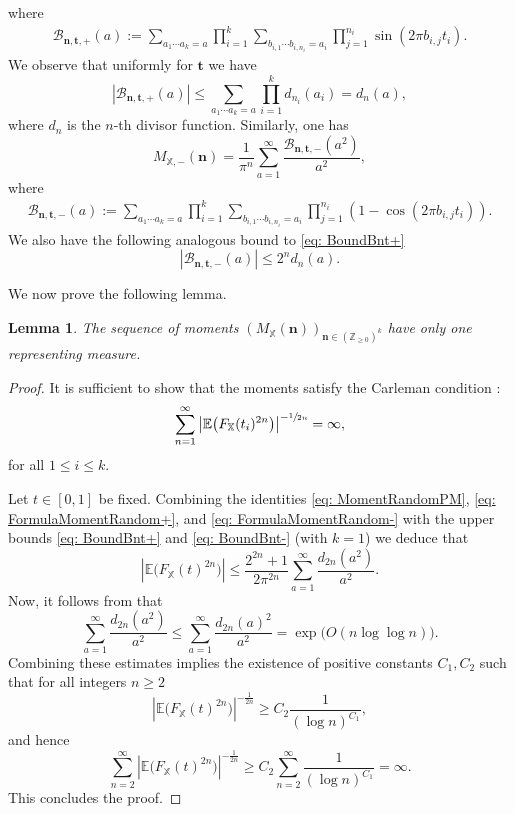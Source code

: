 \documentclass[JEP,XML,SOM,Unicode,NoFloatCountersInSection,published]{cedram}
\theoremstyle{plain}
\newtheorem{lem}[thm]{Lemma}
\theoremstyle{definition}
\newcommand{\X}{\mathbb{X}}
\newcommand{\ex}{\mathbb{E}}
\begin{document}
where
\begin{align*}
\mathcal{B}_{\boldsymbol{n},\mathbf{t},+}(a)
:= \sum_{a_{1}\cdots a_{k} = a} \prod_{i = 1}^k \sum_{b_{i,1} \cdots b_{i,n_i} = a_i } \prod_{j = 1}^{n_i} \sin(2 \pi b_{i,j} t_i).
\end{align*}
We observe that uniformly for $\mathbf{t}$ we have
\begin{equation}\label{eq: BoundBnt+}
|\mathcal{B}_{\boldsymbol{n},\mathbf{t}, +}(a)| \leq \sum_{a_1 \cdots a_k = a} \prod_{i = 1}^k d_{n_i}(a_i) = d_n (a),
\end{equation}
where $d_n$ is the $n$-th divisor function.
Similarly, one has
\begin{equation}\label{eq: FormulaMomentRandom-}
M_{\X,-}(\boldsymbol{n})= \frac{1}{\pi^{n}} \sum_{a=1}^{\infty} \frac{\mathcal{B}_{\boldsymbol{n},\mathbf{t}, -}(a^2)}{a^2},
\end{equation}
where \begin{align*}
\mathcal{B}_{\boldsymbol{n},\mathbf{t},-}(a)
:= \sum_{a_{1}\cdots a_{k} = a} \prod_{i = 1}^k \sum_{b_{i,1}\cdots b_{i,n_i} = a_i } \prod_{j = 1}^{n_i} (1-\cos(2 \pi b_{i,j} t_i)).
\end{align*}
We also have the following analogous bound to \eqref{eq: BoundBnt+}
\begin{equation}\label{eq: BoundBnt-}|\mathcal{B}_{\boldsymbol{n},\mathbf{t}, -}(a)|\leq 2^nd_n(a).
\end{equation}

We now prove the following lemma.
\begin{lem}
The sequence of moments $(M_{\X}(\boldsymbol{n}))_{\boldsymbol{n}\in (\mathbb{Z}_{\geq 0})^k}$ have only one representing measure.\end{lem}

\begin{proof}
It is sufficient to show that the moments satisfy the Carleman condition \cite[Th.\,15.11]{Sc}:
\begin{align}\label{eq: carleman condition}
\sum_{n = 1}^\infty \left|\ex\big(F_{\X}(t_i)^{2n}\big)\right|^{-\sfrac{1}{2n}} = \infty,
\end{align}
for all $1\leq i\leq k$.

Let $t\in [0, 1]$ be fixed. Combining the identities \eqref{eq: MomentRandomPM}, \eqref{eq: FormulaMomentRandom+}, and \eqref{eq: FormulaMomentRandom-} with the upper bounds \eqref{eq: BoundBnt+} and \eqref{eq: BoundBnt-} (with $k=1$) we deduce that
\[
\left|\ex\big(F_{\X}(t)^{2n}\big)\right| \leq \frac{2^{2n}+1}{2\pi^{2n}} \sum_{a=1}^{\infty}\frac{d_{2n}(a^2)}{a^2}.
\]
Now, it follows from \cite[Lem.\,3.3]{La2} that
\[\sum_{a=1}^{\infty}\frac{d_{2n}(a^2)}{a^2} \leq \sum_{a=1}^{\infty}\frac{d_{2n}(a)^2}{a^2}= \exp\big(O(n\log\log n)\big).\]
Combining these estimates implies the existence of positive constants $C_1, C_2$ such that for all integers $n\geq 2$
\[
\left|\ex\big(F_{\X}(t)^{2n}\big)\right|^{-\frac{1}{2n}} \geq C_2 \frac{1}{(\log n)^{C_1}},\]
and hence
\[
\sum_{n=2}^{\infty}\left|\ex\big(F_{\X}(t)^{2n}\big)\right|^{-\frac{1}{2n}}\geq C_2 \sum_{n=2}^{\infty}\frac{1}{(\log n)^{C_1}}= \infty.\]
This concludes the proof.
\end{proof}
\end{document}
